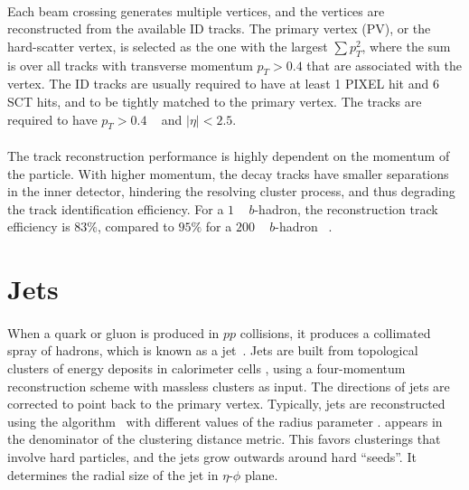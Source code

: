 \paragraph{}
Each beam crossing generates multiple vertices, and the vertices are reconstructed from the available ID tracks. 
The primary vertex (PV), or the hard-scatter vertex, is selected as the one with the largest $\sum p_T^2$, where the sum is over all tracks with transverse momentum $p_T > 0.4$ \GeV that are associated with the vertex.
The ID tracks are usually required to have at least 1 PIXEL hit and 6 SCT hits, and to be tightly matched to the primary vertex. 
The tracks are required to have $p_T > 0.4$ \GeV~ and $|\eta| < 2.5$.

\paragraph{}
The track reconstruction performance is highly dependent on the momentum of the particle. 
With higher momentum, the decay tracks have smaller separations in the inner detector, hindering the resolving cluster process, and thus degrading the track identification efficiency. 
For a $1$ \TeV~ $b$-hadron, the reconstruction track efficiency is $83\%$, compared to $95\%$ for a $200$ \GeV~ $b$-hadron ~\cite{Aaboud:2017all}.

\section{Jets}
\paragraph{}
When a quark or gluon is produced in $pp$ collisions, it produces a collimated spray of hadrons, which is known as a jet~\cite{Salam:2009jx}.
Jets are built from topological clusters of energy deposits in calorimeter cells \cite{PERF-2014-07}, using a four-momentum reconstruction scheme with massless clusters as input. 
The directions of jets are corrected to point back to the primary vertex.
Typically, jets are reconstructed using the \akt algorithm~\cite{AntiKt} with different values of the radius parameter \R.
\R appears in the denominator of the clustering distance metric. 
This favors clusterings that involve hard particles, and the jets grow outwards around hard ``seeds''.
It determines the radial size of the jet in $\eta$-$\phi$ plane.

